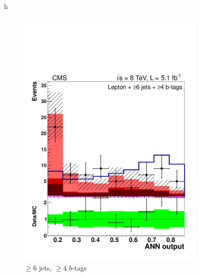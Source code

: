 \begin{figure}{h}
\begin{subfigure}[h]{0.31\textwidth}
        \includegraphics[width=\textwidth]{Figures/Analysis_1_Diagrams/d2MCPlots_CFMlpANN_cut9_jge6_tge4_Combined_HtWgt.pdf}
        \caption{$\ge$6 jets, $\ge$4 $b$-tags}\label{lj_ANNoutput_8TeV_7}
      \end{subfigure}
      ~ %
      \begin{subfigure}[h]{0.25\textwidth}

\end{subfigure}
\end{figure}
